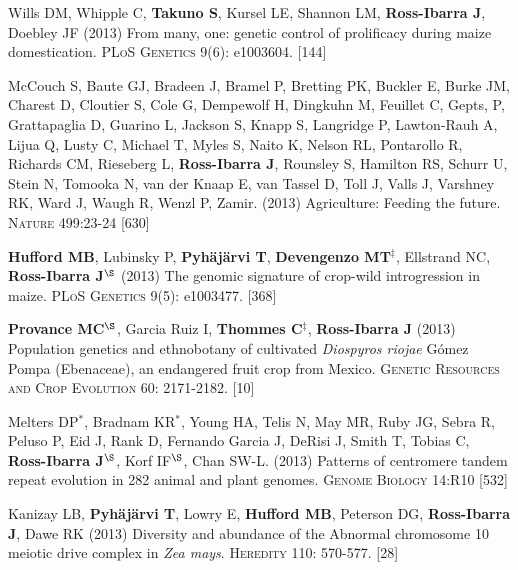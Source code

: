 \documentclass[letterpaper,10pt]{article}
\begin{document}
\begin{etaremune}
\item Wills DM, Whipple C, {\bf Takuno S}, Kursel LE, Shannon LM, {\bf Ross-Ibarra J}, Doebley JF (2013) From many, one: genetic control of prolificacy during maize domestication. \textsc{PLoS Genetics} 9(6): e1003604. %
 [144]\\

\item McCouch S, Baute GJ, Bradeen J, Bramel P, Bretting PK, Buckler E, Burke JM, Charest D, Cloutier S, Cole G, Dempewolf H, Dingkuhn M, Feuillet C, Gepts, P, Grattapaglia D, Guarino L, Jackson S, Knapp S, Langridge P, Lawton-Rauh A, Lijua Q, Lusty C, Michael T, Myles S, Naito K, Nelson RL, Pontarollo R, Richards CM, Rieseberg L, {\bf Ross-Ibarra J}, Rounsley S, Hamilton RS, Schurr U, Stein N, Tomooka N, van der Knaap E, van Tassel D, Toll J, Valls J, Varshney RK, Ward J, Waugh R, Wenzl P, Zamir. (2013) Agriculture: Feeding the future. \textsc{Nature} 499:23-24
 [630]\\

\item {\bf Hufford MB}, Lubinsky P, {\bf Pyh\"aj\"arvi T}, {\bf Devengenzo MT}$^\ddagger$, Ellstrand NC, {\bf Ross-Ibarra J}$^\S$ (2013) The genomic signature of crop-wild introgression in maize. \textsc{PLoS Genetics} 9(5): e1003477. %
 [368]\\


\item {\bf Provance MC}$^\S$, Garcia Ruiz I, {\bf Thommes C}$^\ddagger$, {\bf Ross-Ibarra J} (2013) Population genetics and ethnobotany of cultivated \emph{Diospyros riojae} G\'omez Pompa (Ebenaceae), an endangered fruit crop from Mexico. \textsc{Genetic Resources and Crop Evolution} 60: 2171-2182.
 [10]\\


\item Melters DP$^*$, Bradnam KR$^*$, Young HA, Telis N, May MR, Ruby JG, Sebra R, Peluso P, Eid J, Rank D, Fernando Garcia J, DeRisi J, Smith T, Tobias C, {\bf Ross-Ibarra J}$^\S$, Korf IF$^\S$, Chan SW-L. (2013) Patterns of centromere tandem repeat evolution in 282 animal and plant genomes. \textsc{Genome Biology} 14:R10
 [532]\\


\item Kanizay LB, {\bf Pyh\"aj\"arvi T}, Lowry E, {\bf Hufford MB}, Peterson DG, {\bf Ross-Ibarra J}, Dawe RK (2013) Diversity and abundance of the Abnormal chromosome 10 meiotic drive complex in \emph{Zea mays}. \textsc{Heredity} 110: 570-577.
 [28]\\



\end{etaremune}
\end{document}
